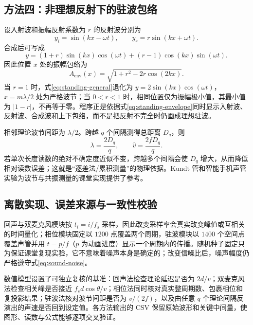 \documentclass[UTF8,a4paper,zihao=-4]{ctexart}
\begin{document}
\subsection{方法四：非理想反射下的驻波包络}
设入射波和振幅反射系数为 $r$ 的反射波分别为
\begin{equation}
 y_i=\sin(kx-\omega t),\qquad
 y_r=r\sin(kx+\omega t).
\end{equation}
合成后可写成
\begin{equation}
 y=(1+r)\sin(kx)\cos(\omega t)
 +(r-1)\cos(kx)\sin(\omega t).
 \label{eq:standing-general}
\end{equation}
因此位置 $x$ 处的振幅包络为
\begin{equation}
 A_{\mathrm{env}}(x)=
 \sqrt{1+r^2-2r\cos(2kx)}.
 \label{eq:standing-envelope}
\end{equation}
当 $r=1$ 时，式\eqref{eq:standing-general}退化为 $y=2\sin(kx)\cos(\omega t)$，$x=m\lambda/2$ 处为严格波节；当 $0<r<1$ 时，相同位置仅为振幅极小值，其最小值为 $|1-r|$，不再等于零。程序正是依据式\eqref{eq:standing-envelope}同时显示入射波、反射波、合成波和上下包络，而不是把反射不完全时仍画成理想驻波。

相邻理论波节间距为 $\lambda/2$。跨越 $q$ 个间隔测得总距离 $D_q$，则
\begin{equation}
 \lambda=\frac{2D_q}{q},\qquad
 \hat v=\frac{2fD_q}{q}.
 \label{eq:standing-speed}
\end{equation}
若单次长度读数的绝对不确定度近似不变，跨越多个间隔会使 $D_q$ 增大，从而降低相对读数误差；这就是“逐差法/累积测量”的物理依据。Kundt 管和智能手机声管实验为波节与共振测量的课堂实现提供了参考\cite{standing2024,hellesund2018,kundt1868}。

\subsection{离散实现、误差来源与一致性校验}
回声与双麦克风模块按 $t_i=i/f_s$ 采样，因此改变采样率会真实改变峰值或互相关的时间量化；相位模块固定以 $1200$ 点覆盖两个周期，驻波模块以 $1400$ 个空间点覆盖声管并用 $t=p/f$（$p$ 为动画进度）显示一个周期内的传播。随机种子固定只为保证课堂复现实验，它不意味着噪声本身是确定的；改变信噪比后，噪声幅度仍严格遵守式\eqref{eq:sound-noise}。

数值模型设置了可独立复核的基准：回声法检查理论延迟是否为 $2d/v$；双麦克风法检查相关峰是否接近 $f_s d\cos\theta/v$；相位法同时核对真实整周期数、包裹相位和复投影结果；驻波法核对波节间距是否为 $v/(2f)$，以及由任意 $q$ 个理论间隔反演出的声速是否回到设定值。各方法输出的 CSV 保留原始波形和关键中间量，使图形、读数与公式能够逐项交叉验证。
\end{document}
